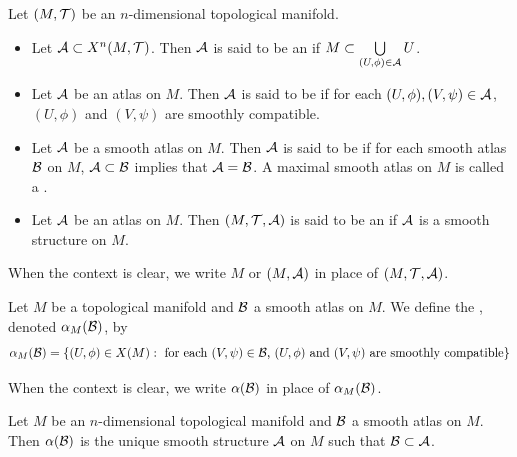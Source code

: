 \documentclass{book}
\begin{document}
	\begin{defn} 
		Let $(M, \mathcal{T})$ be an $n$-dimensional topological manifold.
		\begin{itemize}
			\item Let $\mathcal{A} \subset X^n(M, \mathcal{T})$. Then $\mathcal{A}$ is said to be an  if  $M \subset \bigcup\limits_{(U,\phi) \in \mathcal{A}} U$.
			\item Let $\mathcal{A}$ be an atlas on $M$. Then $\mathcal{A}$ is said to be  if for each $(U, \phi), (V, \psi) \in \mathcal{A}$, $(U,\phi)$ and $(V,\psi)$ are smoothly compatible.
			\item Let $\mathcal{A}$ be a smooth atlas on $M$. Then $\mathcal{A}$ is said to be  if for each smooth atlas $\mathcal{B}$ on $M$, $\mathcal{A} \subset \mathcal{B}$ implies that $\mathcal{A} = \mathcal{B}$. A maximal smooth atlas on $M$ is called a .
			\item Let $\mathcal{A}$ be an atlas on $M$. Then $(M, \mathcal{T}, \mathcal{A})$ is said to be an  if $\mathcal{A}$ is a smooth structure on $M$. 
		\end{itemize}
	\end{defn}

	\begin{note}
		When the context is clear, we write $M$ or $(M, \mathcal{A})$ in place of $(M, \mathcal{T}, \mathcal{A})$.
	\end{note}

	\begin{defn} 
		Let $M$ be a topological manifold and $\mathcal{B}$ a smooth atlas on $M$. We define the , denoted $\alpha_M(\mathcal{B})$, by 
		$$\alpha_M(\mathcal{B}) = \{(U, \phi) \in X(M): \text{ for each $(V, \psi) \in \mathcal{B}$,  $(U, \phi)$ and $(V, \psi) $ are smoothly compatible}\}$$
	\end{defn}

	\begin{note}
		When the context is clear, we write $\alpha(\mathcal{B})$ in place of $\alpha_M(\mathcal{B})$.
	\end{note}

	\begin{ex} 
		Let $M$ be an $n$-dimensional topological manifold and $\mathcal{B}$ a smooth atlas on $M$. Then $\alpha(\mathcal{B})$ is the unique smooth structure $\mathcal{A}$ on $M$ such that $\mathcal{B} \subset \mathcal{A}$.
	\end{ex}
\end{document}
